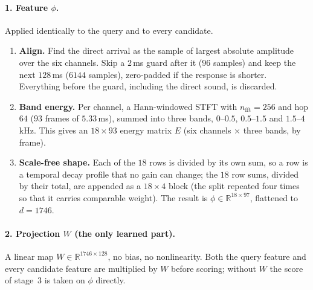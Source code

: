 \paragraph{1. Feature $\phi$.}
Applied identically to the query and to every candidate.
\begin{enumerate}
  \item \textbf{Align.} Find the direct arrival as the sample of largest
        absolute amplitude over the six channels. Skip a $2$\,ms guard after it
        ($96$ samples) and keep the next $128$\,ms ($6144$ samples), zero-padded
        if the response is shorter. Everything before the guard, including the
        direct sound, is discarded.
  \item \textbf{Band energy.} Per channel, a Hann-windowed STFT with $n_\mathrm{fft}=256$
        and hop $64$ ($93$ frames of $5.33$\,ms), summed into three bands,
        $0$--$0.5$, $0.5$--$1.5$ and $1.5$--$4$\,kHz. This gives an
        $18 \times 93$ energy matrix $E$ (six channels $\times$ three bands, by frame).
  \item \textbf{Scale-free shape.} Each of the $18$ rows is divided by its own sum,
        so a row is a temporal decay profile that no gain can change; the $18$
        row sums, divided by their total, are appended as a $18 \times 4$ block
        (the split repeated four times so that it carries comparable weight).
        The result is $\phi \in \mathbb{R}^{18 \times 97}$, flattened to
        $d = 1746$.
\end{enumerate}

\paragraph{2. Projection $W$ (the only learned part).}
A linear map $W \in \mathbb{R}^{1746 \times 128}$, no bias, no nonlinearity. Both
the query feature and every candidate feature are multiplied by $W$ before
scoring; without $W$ the score of stage~3 is taken on $\phi$ directly.

